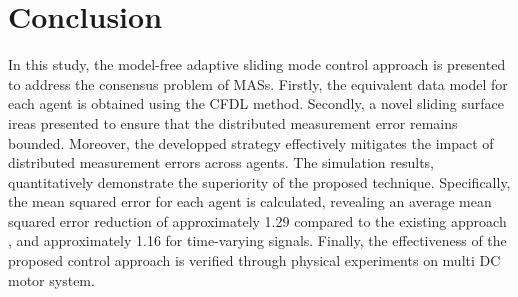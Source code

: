 \documentclass[journal,onecolumn]{IEEEtran}
\begin{document}
\section{Conclusion}

In this study, the model-free adaptive sliding mode control approach is presented to address the consensus problem of MASs. Firstly, the equivalent data model for each agent is obtained using the CFDL method. Secondly, a novel sliding surface ireas presented to ensure that the distributed measurement error remains bounded. Moreover, the developped strategy effectively mitigates the impact of distributed measurement errors across agents. The simulation results, quantitatively demonstrate the superiority of the proposed technique. Specifically, the mean squared error for each agent is calculated, revealing an average mean squared error reduction of approximately 1.29 compared to the existing approach \cite{1}, and approximately 1.16 for time-varying signals. Finally, the effectiveness of the proposed control approach is verified through physical experiments on multi DC motor system.








\end{document}
